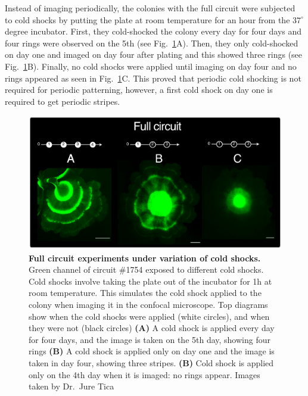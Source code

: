 Instead of imaging periodically, the colonies with the full circuit were subjected to cold shocks by putting the plate at room temperature for an hour from the $37^{\circ}$ degree incubator.
First, they cold-shocked the colony every day for four days and four rings were observed on the 5th (see Fig.~\ref{fig:cold_shock_experiments}A).
Then, they only cold-shocked on day one and imaged on day four after plating and this showed three rings (see Fig.~\ref{fig:cold_shock_experiments}B).
Finally, no cold shocks were applied until imaging on day four and no rings appeared as seen in Fig.~\ref{fig:cold_shock_experiments}C.
This proved that periodic cold shocking is not required for periodic patterning, however, a first cold shock on day one is required to get periodic stripes.



\begin{figure}[H] %
    \centering
    \begin{adjustbox}{center}
        \includegraphics[width=1\textwidth]{chapters/Chapter 3/cold_shock_experiments} %
    \end{adjustbox}
    \caption{\textbf{Full circuit experiments under variation of cold shocks.} Green channel of circuit \#1754 exposed to different cold shocks. Cold shocks involve taking the plate out of the incubator for 1h at room temperature. This simulates the cold shock applied to the colony when imaging it in the confocal microscope. Top diagrams show when the cold shocks were applied (white circles), and when they were not (black circles) \textbf{(A)} A cold shock is applied every day for four days, and the image is taken on the 5th day, showing four rings \textbf{(B)} A cold shock is applied only on day one and the image is taken in day four, showing three stripes.  \textbf{(B)} Cold shock is applied only on the 4th day when it is imaged: no rings appear. Images taken by Dr.~Jure Tica}
    \label{fig:cold_shock_experiments}
\end{figure}

